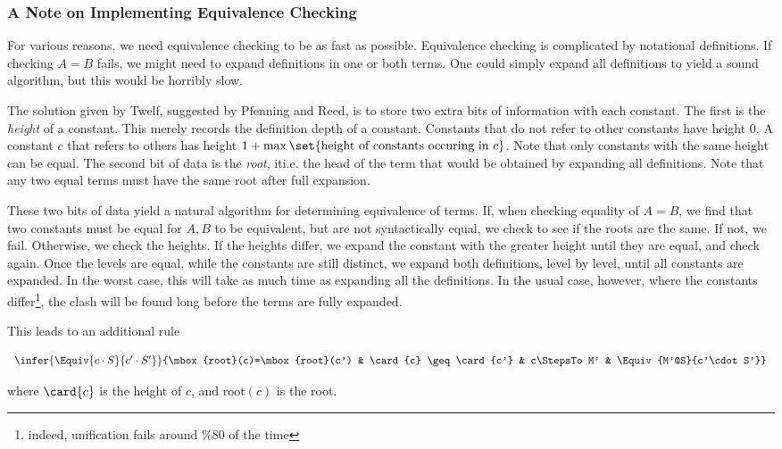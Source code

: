 
\subsubsection{A Note on Implementing Equivalence Checking}

  For various reasons, we need equivalence checking to
be as fast as possible.  Equivalence checking is complicated
by notational definitions.  If checking $A=B$ fails, we might need
to expand definitions in one or both terms.  One could simply
expand all definitions to yield a sound algorithm, but this would
be horribly slow.  

  The solution given by Twelf, suggested by 
Pfenning and Reed, is to store two extra bits of information 
with each constant.  The first is the \emph{height} of a constant.
This merely records the definition depth of a constant.  Constants that
do not refer to other constants have height 0.  A constant $c$ that refers
to others has height $1 + \max\set{\mbox{height of constants occuring in } c}$.
Note that only constants with the same height can be equal.  
The second bit of data is the \emph{root}, it{i.e.} the head of the term that would be obtained by 
expanding all definitions.  Note that any two equal terms must have the
same root after full expansion. 

These two bits of data yield a natural algorithm for determining 
equivalence of terms.  If, when checking equality of $A=B$,
we find that two constants must be equal for $A,B$ to
be equivalent, but are not syntactically equal, 
we check to see if the roots are the same.
If not, we fail.  Otherwise, we check the heights.  If the heights
differ, we expand the constant with the greater height until 
they are equal, and check again.  Once the levels
are equal, while the constants are still distinct, we 
expand both definitions, level by level, until all constants
are expanded.  In the worst case, this will take as much time
as expanding all the definitions.  In the usual case, however,
where the constants differ\footnote{indeed, unification fails
around \%80 of the time}, the clash will be found long before
the terms are fully expanded.  

This leads to an additional rule 

\newcommand{\Root}{\mbox{root}}
$$
\begin{array}{cccc}
\infer{\Equiv{c\cdot S}{c'\cdot S'}}{\Root(c)=\Root(c') & \card{c} \geq \card{c'} & c\StepsTo M' & \Equiv{M'@S}{c'\cdot S'}} 
\end{array} 
$$

where $\card{c}$ is the height of $c$, and $\Root(c)$ is the root.
